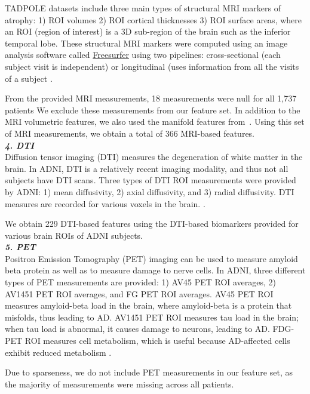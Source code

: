 \documentclass{article}
\begin{document}
TADPOLE datasets include three main types of structural MRI markers of atrophy: 1) ROI volumes 2) ROI cortical thicknesses 3) ROI surface areas, where an ROI (region of interest) is a 3D sub-region of the brain such as the inferior temporal lobe. These structural MRI markers were computed using an image analysis software called \href{https://surfer.nmr.mgh.harvard.edu/fswiki/LongitudinalProcessing}{Freesurfer} using two pipelines: cross-sectional (each subject visit is independent) or longitudinal (uses information from all the visits of a subject \cite{tadpole2017}.

From the provided MRI measurements, 18 measurements were null for all 1,737 patients We exclude these measurements from our feature set. In addition to the MRI volumetric features, we also used the manifold features from~\cite{guerrero2017group}. Using this set of MRI measurements, we obtain a total of 366 MRI-based features. \\

\textbf{\textit{4. DTI}}\\
Diffusion tensor imaging (DTI) measures the degeneration of white matter in the brain. In ADNI, DTI is a relatively recent imaging modality, and thus not all subjects have DTI scans. Three types of DTI ROI measurements were provided by ADNI: 1) mean diffusivity, 2) axial diffusivity, and 3) radial diffusivity. DTI measures are recorded for various voxels in the brain. \cite{tadpole2017}.

We obtain 229 DTI-based features using the DTI-based biomarkers provided for various brain ROIs of ADNI subjects. \\

\textbf{\textit {5. PET}}\\
Positron Emission Tomography (PET) imaging can be used to measure amyloid beta protein as well as to measure damage to nerve cells. In ADNI, three different types of PET measurements are provided: 1) AV45 PET ROI averages, 2) AV1451 PET ROI averages, and FG PET ROI averages. AV45 PET ROI measures amyloid-beta load in the brain, where amyloid-beta is a protein that misfolds, thus leading to AD. AV1451 PET ROI measures tau load in the brain; when tau load is abnormal, it causes damage to neurons, leading to AD. FDG-PET ROI measures cell metabolism, which is useful because AD-affected cells exhibit reduced metabolism \cite{tadpole2017}.

Due to sparseness, we do not include PET measurements in our feature set, as the majority of measurements were missing across all patients. 
\\
\end{document}
